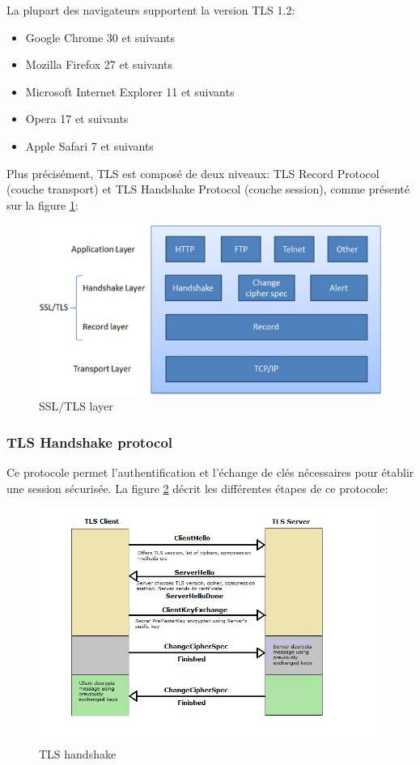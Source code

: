 La plupart des navigateurs supportent la version TLS 1.2:
\begin{itemize}
\item Google Chrome 30 et suivants
\item Mozilla Firefox 27 et suivants
\item Microsoft Internet Explorer 11 et suivants
\item Opera 17 et suivants
\item Apple Safari 7 et suivants
\end{itemize}
Plus précisément, TLS est composé de deux niveaux: TLS Record Protocol (couche transport) et TLS Handshake Protocol (couche session), comme présenté sur la figure \ref{ssl-tls-diag}: \\

\begin{figure}[H]
  \centering
  \includegraphics[scale=0.5]{img/ssl-tls-diag.jpg}
  \caption{SSL/TLS layer}
  \label{ssl-tls-diag}
\end{figure}  


\subsubsection{TLS Handshake protocol}

Ce protocole permet l'authentification et l'échange de clés nécessaires pour établir une session sécurisée. La figure \ref{handshake} décrit les différentes étapes de ce protocole:
\begin{figure}[H]
  \centering
  \includegraphics[scale=0.6]{img/tls-handshake.png}
  \caption{TLS handshake}
  \label{handshake}
\end{figure}  

